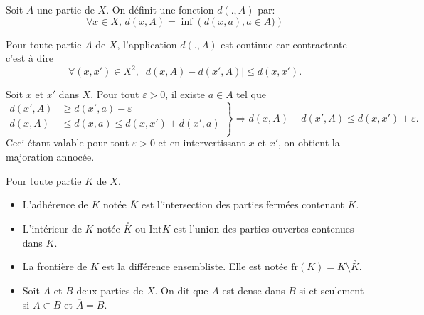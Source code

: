 \begin{defi}
 Soit $A$ une partie de $X$. On définit une fonction $d(.,A)$ par:
 \begin{displaymath}
  \forall x\in X, \, d(x,A) = \inf\left(d(x,a), a\in A)\right)
 \end{displaymath}
\end{defi}

\begin{propn}\label{prop:ContDistPart}
 Pour toute partie $A$ de $X$, l'application $d(.,A)$ est continue car contractante c'est à dire
 \begin{displaymath}
  \forall (x,x') \in X^2, \; \left|d(x,A) - d(x',A)\right| \leq d(x,x').
 \end{displaymath}
\end{propn}
\begin{demo}
Soit $x$ et $x'$ dans $X$. Pour tout $\varepsilon > 0$, il existe $a \in A$ tel que
\begin{displaymath}
\left.
  \begin{aligned}
    d(x',A) &\geq d(x',a) - \varepsilon \\
    d(x,A) &\leq d(x,a) \leq d(x,x') + d(x',a)\\
  \end{aligned}
\right\rbrace
\Rightarrow
d(x,A) - d(x',A) \leq d(x,x') + \varepsilon.
\end{displaymath}
Ceci étant valable pour tout $\varepsilon >0$ et en intervertissant $x$ et $x'$, on obtient la majoration annocée.
\end{demo}

   
\begin{defi}
Pour toute partie $K$ de $X$.
\begin{itemize}
 \item L'adhérence de $K$ notée $\overline{K}$ est l'intersection des parties fermées contenant $K$.
 \item L'intérieur de $K$ notée $\overset{\circ}{K}$ ou $\mathrm{Int}K $ est l'union des parties ouvertes contenues dans $K$.
 \item La frontière de $K$ est la différence ensembliste. Elle est notée $\mathrm{fr}(K) = \overline{K} \setminus \overset{\circ}{K}$.
 \item Soit $A$ et $B$ deux parties de $X$. On dit que $A$ est dense dans $B$ si et seulement si $A\subset B$ et $\overline{A} = B$.
\end{itemize}
\end{defi}

